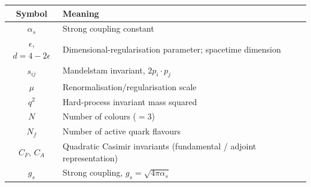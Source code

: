 \begin{longtable}{|c|p{10.5cm}|}
    \hline
    \textbf{Symbol} & \textbf{Meaning} \\
    \hline
    \endhead
    $\alpha_s$ & Strong coupling constant \\ \hline
    $\epsilon$, $d=4-2\epsilon$ & Dimensional-regularisation parameter; spacetime dimension \\ \hline
    $s_{ij}$ & Mandelstam invariant, $2p_i\cdot p_j$ \\ \hline
    $\mu$ & Renormalisation/regularisation scale \\ \hline
    $q^2$ & Hard-process invariant mass squared \\ \hline
    $N$ & Number of colours ($=3$) \\ \hline
    $N_f$ & Number of active quark flavours \\ \hline
    $C_F$, $C_A$ & Quadratic Casimir invariants (fundamental / adjoint representation) \\ \hline
    $g_s$ & Strong coupling, $g_s=\sqrt{4\pi\alpha_s}$ \\ \hline
\end{longtable}
